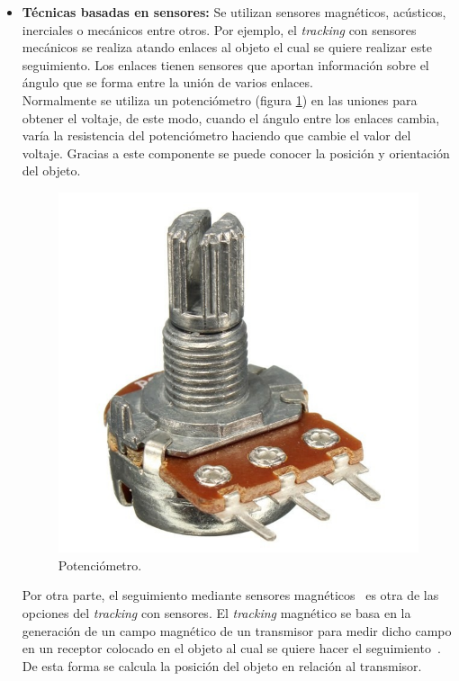 \begin{itemize}
    \item \textbf{Técnicas basadas en sensores:} Se utilizan sensores magnéticos, acústicos, inerciales o mecánicos entre otros. Por ejemplo, el \textit{tracking} con sensores mecánicos se realiza atando enlaces al objeto el cual se quiere realizar este seguimiento. Los enlaces tienen sensores que aportan información sobre el ángulo que se forma entre la unión de varios enlaces.\\
    
    
    Normalmente se utiliza un potenciómetro (figura \ref{fig:potenciometro}) en las uniones para obtener el voltaje, de este modo, cuando el ángulo entre los enlaces cambia, varía la resistencia del potenciómetro haciendo que cambie el valor del voltaje. Gracias a este componente se puede conocer la posición y orientación del objeto.
    
    \begin{figure}[H]
    \centering
    \includegraphics[scale=0.14]{Images/Estado del arte/potenciometro.jpg}
    \caption{Potenciómetro.}
    \label{fig:potenciometro}
\end{figure}

    Por otra parte, el seguimiento mediante sensores magnéticos~\cite{magneticIntro} es otra de las opciones del \textit{tracking} con sensores. El \textit{tracking} magnético se basa en la generación de un campo magnético de un transmisor para medir dicho campo en un receptor colocado en el objeto al cual se quiere hacer el seguimiento~\cite{magneticExplanation}. De esta forma se calcula la posición del objeto en relación al transmisor.\\
    

\end{itemize}
